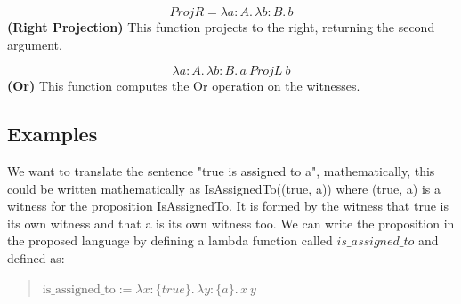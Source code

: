 \begin{equation}
    ProjR=\lambda a : A.\,\lambda b : B.\,b
\end{equation}
\textbf{(Right Projection)}  
This function projects to the right, returning the second argument.

\begin{equation}
    \lambda a : A.\,\lambda b : B.\,a\ ProjL\ b
\end{equation}
\textbf{(Or)}  
This function computes the Or operation on the witnesses.


\subsection{Examples}

We want to translate the sentence "true is assigned to a", mathematically, this could be written mathematically as IsAssignedTo((true, a)) where (true, a) is a witness for the proposition IsAssignedTo. It is formed by the witness that true is its own witness and that a is its own witness too. We can write the proposition in the proposed language by defining a lambda function called $is\_assigned\_to$ and defined as:

\begin{quote}
$\mathrm{is\_assigned\_to}:=\lambda x: \{true\}.\,\lambda y: \{a\}.\,x\ y$
\end{quote}